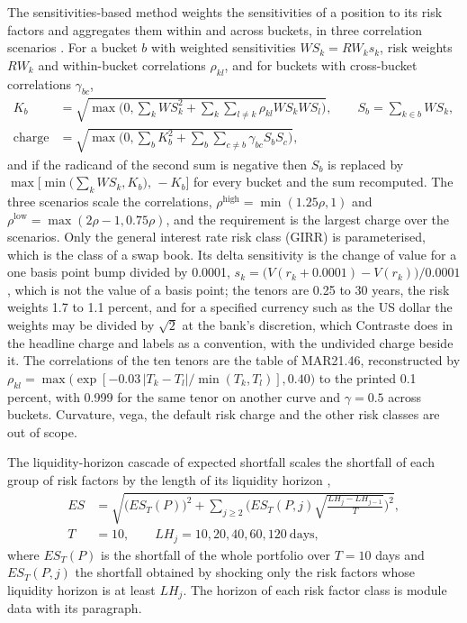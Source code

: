 The sensitivities-based method weights the sensitivities of a position to its risk factors and aggregates them within and across buckets, in three correlation scenarios \citep{ccr:mar21}. For a bucket $b$ with weighted sensitivities $WS_k=RW_ks_k$, risk weights $RW_k$ and within-bucket correlations $\rho_{kl}$, and for buckets with cross-bucket correlations $\gamma_{bc}$,
\begin{equation}
\begin{aligned}
K_b&=\sqrt{\max\Big(0,\sum_kWS_k^2+\sum_k\sum_{l\ne k}\rho_{kl}WS_kWS_l\Big)},\qquad S_b=\sum_{k\in b}WS_k,\\
\text{charge}&=\sqrt{\max\Big(0,\sum_bK_b^2+\sum_b\sum_{c\ne b}\gamma_{bc}S_bS_c\Big)},
\end{aligned}
\label{eq:ccr-sbm}
\end{equation}
and if the radicand of the second sum is negative then $S_b$ is replaced by $\max\big[\min\big(\sum_kWS_k,K_b\big),\,\allowbreak-K_b\big]$ for every bucket and the sum recomputed. The three scenarios scale the correlations, $\rho^{\mathrm{high}}=\min(1.25\rho,1)$ and $\rho^{\mathrm{low}}=\max(2\rho-1,0.75\rho)$, and the requirement is the largest charge over the scenarios. Only the general interest rate risk class (GIRR) is
parameterised, which is the class of a swap book. Its delta sensitivity is the change of value for a one basis point bump divided by 0.0001, $s_k=\big(V(r_k+0.0001)-V(r_k)\big)/0.0001$, which is not the value of a basis point; the tenors are 0.25 to 30 years, the risk weights 1.7 to 1.1 percent, and for a specified currency such as the US dollar the weights may be divided by $\sqrt2$ at the bank's discretion, which Contraste does in the headline charge and
labels as a convention, with the undivided charge beside it. The correlations of the ten tenors are the table of MAR21.46, reconstructed by $\rho_{kl}=\max\big(\exp[-0.03\,|T_k-T_l|/\min(T_k,T_l)],0.40\big)$ to the printed 0.1 percent, with 0.999 for the same tenor on another curve and $\gamma=0.5$ across buckets. Curvature, vega, the default risk charge and the other risk classes are out of scope.

The liquidity-horizon cascade of expected shortfall scales the shortfall of each group of risk factors by the length of its liquidity horizon \citep{ccr:mar33},
\begin{equation}
\begin{aligned}
ES&=\sqrt{\big(ES_T(P)\big)^2+\sum_{j\ge2}\Big(ES_T(P,j)\sqrt{\frac{LH_j-LH_{j-1}}{T}}\Big)^2},\\
T&=10,\qquad LH_j=10,20,40,60,120\ \text{days},
\end{aligned}
\label{eq:ccr-cascade}
\end{equation}
where $ES_T(P)$ is the shortfall of the whole portfolio over $T=10$ days and $ES_T(P,j)$ the shortfall obtained by shocking only the risk factors whose liquidity horizon is at least $LH_j$. The horizon of each risk factor class is module data with its paragraph.

